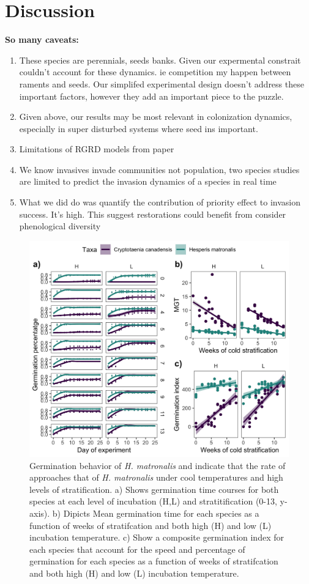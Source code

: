 \documentclass{article}\usepackage[]{graphicx}\usepackage[]{color}
\begin{document}
\section*{Discussion}
\textbf{So many caveats:}
\begin{enumerate}
\item These species are perennials, seeds banks. Given our expermental constrait couldn't account for these dynamics. ie competition my happen between raments and seeds. Our simplifed experimental design doesn't address these important factors, however they add an important piece to the puzzle. 
\item Given above, our results may be most relevant in colonization dynamics, especially in super disturbed systems where seed ins important.
\item Limitations of RGRD models from paper
\item We know invasives invade communities not population, two species studies are limited to predict the invasion dynamics of a species in real time
\item What we did do was quantify the contribution of priority effect to invasion success. It's high. This suggest restorations could benefit from consider phenological diversity 
\end{enumerate}

\begin{figure}[h!]
    \centering
         \includegraphics[width=\textwidth]{..//figure/crp_hesp1.jpeg}
    \caption{Germination behavior of \textit{H. matronalis} and  indicate that the rate of  approaches that of \textit{H. matronalis} under cool temperatures and high levels of stratification. a) Shows germination time courses for both species at each level of incubation (H,L) and stratitification (0-13, y-axis). b) Dipicts Mean germination time for each species as a function of weeks of stratifcation and both high (H) and low (L) incubation temperature. c) Show a composite germination index for each species that account for the speed and percentage of germination for each species as a function of weeks of stratifcation and both high (H) and low (L) incubation temperature. } 
    \label{fig:aft}
\end{figure}
\end{document}
